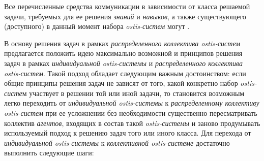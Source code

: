 Все перечисленные средства коммуникации в зависимости от класса решаемой задачи, требуемых для ее решения \textit{знаний} и \textit{навыков}, а также существующего (доступного) в данный момент набора \textit{ostis-систем} могут .

В основу решения задач в рамках \textit{распределенного коллектива ostis-систем} предлагается положить идею максимально возможной  и  принципов решения задач в рамках \textit{индивидуальной ostis-системы} и \textit{распределенного коллектива ostis-систем}. Такой подход обладает следующим важным достоинством: если общие принципы решения задач не зависят от того, какой конкретно набор \textit{ostis-систе}м участвует в решении той или иной задачи, то становится возможным легко переходить от \textit{индивидуальной ostis-системы} к \textit{распределенному коллективу ostis-систем} при ее усложнении без необходимости существенно пересматривать коллектив \textit{агентов}, входящих в состав такой \textit{ostis-системы} и заново продумывать используемый подход к решению задач того или иного класса. Для перехода от \textit{индивидуальной ostis-системы} к \textit{коллективной ostis-системе} достаточно выполнить следующие шаги:
